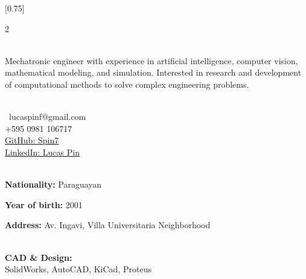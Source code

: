 \documentclass[lighthipster]{simplehipstercv}
\begin{document}
\setlength{\columnsep}{1.5cm}
[0.75]
\begin{paracol}{2}
\paracolbackgroundoptions



\footnotesize
{\setasidefontcolour
\flushleft
\begin{center}
\end{center}
\vspace{-0.4cm}
\\[0.5em]

{
Mechatronic engineer with experience in artificial intelligence, computer vision, mathematical modeling, and simulation. Interested in research and development of computational methods to solve complex engineering problems.}
\bigskip

 \\[0.5em]

\small %
\ {\small lucaspinf@gmail.com} \\
 +595 0981 106717\\
 \href{https://github.com/Spin7}{GitHub: Spin7}\\
 \href{https://www.linkedin.com/in/lucas-pin-0015393a8/}{LinkedIn: Lucas Pin}\\

\bigskip

 \\[0.5em]

\textbf{Nationality:} Paraguayan

\textbf{Year of birth:} 2001

\textbf{Address:} Av. Ingavi, Villa Universitaria Neighborhood

\bigskip

 \\[0.5em]

\textbf{CAD \& Design:}\\ SolidWorks, AutoCAD, KiCad, Proteus \\[0.3em]

}
\end{paracol}
\end{document}
